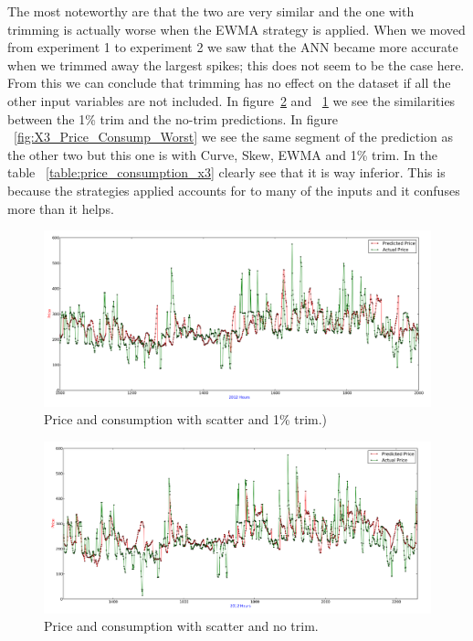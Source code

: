 The most noteworthy are that the two are very similar and the one with trimming is actually worse when the EWMA strategy is applied. When we moved from experiment 1 to experiment 2 we saw that the ANN became more accurate when we trimmed away the largest spikes; this does not seem to be the case here. From this we can conclude that trimming has no effect on the dataset if all the other input variables are not included. In figure~\ref{fig:X3_Price_Consump_NoTrim} and ~\ref{fig:X3_Price_Consump_1pTrim} we see the similarities between the 1\% trim and the no-trim predictions. In figure ~\ref{fig:X3_Price_Consump_Worst} we see the same segment of the prediction as the other two but this one is with Curve, Skew, EWMA and 1\% trim. In the table ~\ref{table:price_consumption_x3} clearly see that it is way inferior. This is because the strategies applied accounts for to many of the inputs and it confuses more than it helps.

\begin{figure}[H]
\centering
\includegraphics[width=\linewidth,natwidth=898,natheight=587]{billeder/PriceExperimentalAnalysis/X3_Price_Consump_1pTrim.png}
\caption{Price and consumption with scatter and 1\% trim.)}
\label{fig:X3_Price_Consump_1pTrim}
\end{figure}

\begin{figure}[H]
\centering
\includegraphics[width=\linewidth,natwidth=898,natheight=587]{billeder/PriceExperimentalAnalysis/X3_Price_Consump_NoTrim.png}
\caption{Price and consumption with scatter and no trim.}
\label{fig:X3_Price_Consump_NoTrim}
\end{figure}

